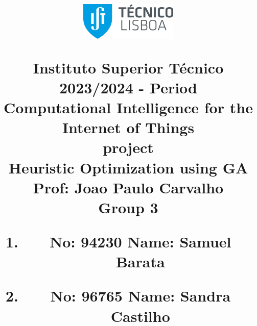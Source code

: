\title{
\centering
\includegraphics[width=0.35\textwidth]{capa/logo.png}\par\vspace{1cm}
\normalfont \large
Instituto Superior Técnico\\
\vspace{5mm}
\normalsize 2023/2024 -  Period \\
\vspace{15mm}
\huge \textbf{Computational Intelligence for the Internet of Things}\\
\vspace{15mm}
\huge { project}\\
\huge {Heuristic Optimization using GA}\\
\normalsize
\vspace{5mm}
\textbf{Prof:} Joao Paulo Carvalho\\
\vspace{15mm}
Group 3
\vspace{5mm}
\begin{enumerate}
    \centering
    \item \textbf{No:} 94230  \hspace{2cm} \textbf{Name:} Samuel Barata
    \item \textbf{No:} 96765  \hspace{2cm} \textbf{Name:} Sandra Castilho
\end{enumerate}
\vspace{25mm}
}
